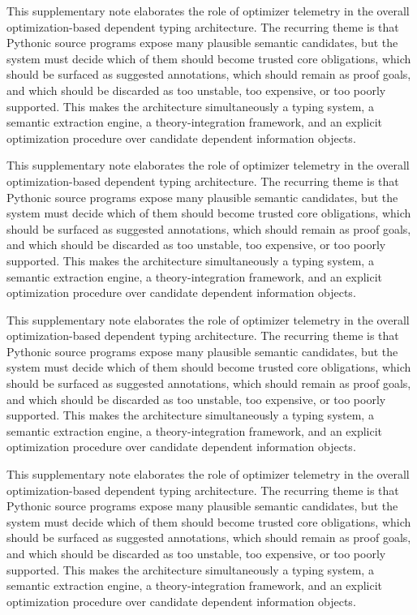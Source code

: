 \documentclass[11pt]{article}
\theoremstyle{definition}
\theoremstyle{plain}
\begin{document}
This supplementary note elaborates the role of optimizer telemetry in the overall
optimization-based dependent typing architecture. The recurring theme is that
Pythonic source programs expose many plausible semantic candidates, but the
system must decide which of them should become trusted core obligations, which
should be surfaced as suggested annotations, which should remain as proof
goals, and which should be discarded as too unstable, too expensive, or too
poorly supported. This makes the architecture simultaneously a typing system,
a semantic extraction engine, a theory-integration framework, and an explicit
optimization procedure over candidate dependent information objects.

This supplementary note elaborates the role of optimizer telemetry in the overall
optimization-based dependent typing architecture. The recurring theme is that
Pythonic source programs expose many plausible semantic candidates, but the
system must decide which of them should become trusted core obligations, which
should be surfaced as suggested annotations, which should remain as proof
goals, and which should be discarded as too unstable, too expensive, or too
poorly supported. This makes the architecture simultaneously a typing system,
a semantic extraction engine, a theory-integration framework, and an explicit
optimization procedure over candidate dependent information objects.

This supplementary note elaborates the role of optimizer telemetry in the overall
optimization-based dependent typing architecture. The recurring theme is that
Pythonic source programs expose many plausible semantic candidates, but the
system must decide which of them should become trusted core obligations, which
should be surfaced as suggested annotations, which should remain as proof
goals, and which should be discarded as too unstable, too expensive, or too
poorly supported. This makes the architecture simultaneously a typing system,
a semantic extraction engine, a theory-integration framework, and an explicit
optimization procedure over candidate dependent information objects.

This supplementary note elaborates the role of optimizer telemetry in the overall
optimization-based dependent typing architecture. The recurring theme is that
Pythonic source programs expose many plausible semantic candidates, but the
system must decide which of them should become trusted core obligations, which
should be surfaced as suggested annotations, which should remain as proof
goals, and which should be discarded as too unstable, too expensive, or too
poorly supported. This makes the architecture simultaneously a typing system,
a semantic extraction engine, a theory-integration framework, and an explicit
optimization procedure over candidate dependent information objects.
\end{document}

